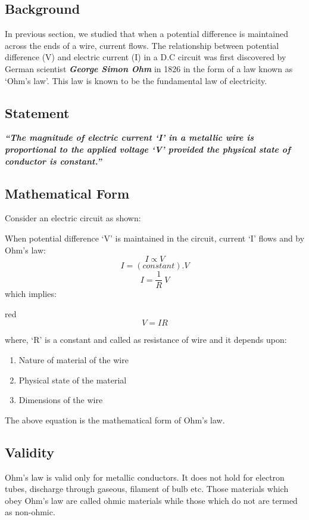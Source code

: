 \subsection*{Background}
In previous section, we studied that when a potential difference is maintained across the ends of a wire, current flows. The relationship between potential difference (V) and electric current (I) in a D.C circuit was first discovered by German scientist \textit{\textbf{George Simon Ohm}} in 1826 in the form of a law known as ‘Ohm’s law’. This law is known to be the fundamental law of electricity.
\subsection*{Statement}
\textit{\textbf{“The magnitude of electric current ‘I’ in a metallic wire is proportional to the applied voltage `V' provided the physical state of conductor is constant.”}}
\subsection*{Mathematical Form}
Consider an electric circuit as shown:

When potential difference ‘V’ is maintained in the circuit, current ‘I’ flows and by Ohm’s law:
\begin{equation}
 I \propto V \nonumber
\end{equation}
\begin{equation}
    I = (constant).V \nonumber
\end{equation}
\begin{equation}
    I = \frac{1}{R}\: V \nonumber
\end{equation}
which implies:
\begin{mybox}{red}{}
\begin{equation}\label{eq:12.5}
V = IR
\end{equation}
\end{mybox}
where, `R’ is a constant and called as resistance of wire and it depends upon:
\begin{enumerate}[label=(\roman*)] 
\item Nature of material of the wire
\item Physical state of the material
\item Dimensions of the wire
\end{enumerate}
The above equation is the mathematical form of Ohm’s law.
\subsection*{Validity}
Ohm’s law is valid only for metallic conductors. It does not hold
for electron tubes, discharge through gaseous, filament of bulb
etc. Those materials which obey Ohm’s law are called ohmic
materials while those which do not are termed as non-ohmic.
